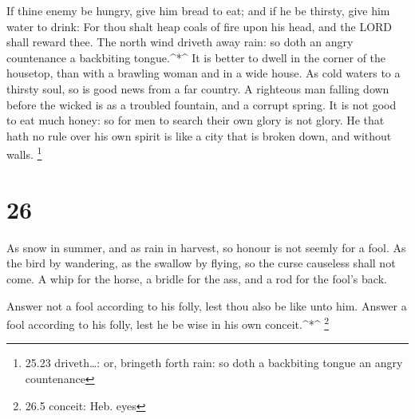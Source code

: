  If thine enemy be hungry, give him bread to eat; and if he
be thirsty, give him water to drink:  For thou shalt heap
coals of fire upon his head, and the LORD shall reward thee.
 The north wind driveth away rain: so doth an angry
countenance a backbiting tongue.\^{}*\^{}  It is better to
dwell in the corner of the housetop, than with a brawling woman and in a
wide house.  As cold waters to a thirsty soul, so is good
news from a far country.  A righteous man falling down
before the wicked is as a troubled fountain, and a corrupt spring.
 It is not good to eat much honey: so for men to search
their own glory is not glory.  He that hath no rule over
his own spirit is like a city that is broken down, and without walls.
\footnote{25.23 driveth\ldots: or, bringeth forth rain: so doth a
  backbiting tongue an angry countenance}

\hypertarget{section-25}{%
\section{26}\label{section-25}}

 As snow in summer, and as rain in harvest, so honour is not
seemly for a fool.  As the bird by wandering, as the swallow
by flying, so the curse causeless shall not come.  A whip
for the horse, a bridle for the ass, and a rod for the fool's back.

 Answer not a fool according to his folly, lest thou also be
like unto him.  Answer a fool according to his folly, lest
he be wise in his own conceit.\^{}*\^{} \footnote{26.5 conceit: Heb.
  eyes}

